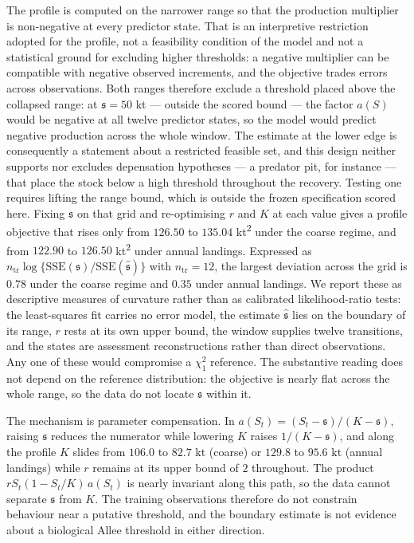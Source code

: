 \documentclass[11pt]{article}
\begin{document}
The profile is computed on the narrower range so that the production
multiplier is non-negative at every predictor state. That is an
interpretive restriction adopted for the profile, not a feasibility
condition of the model and not a statistical ground for excluding higher
thresholds: a negative multiplier can be compatible with negative
observed increments, and the objective trades errors across
observations. Both ranges therefore exclude
a threshold placed above the collapsed range: at \(\mathfrak s = 50\) kt
--- outside the scored bound --- the factor \(a(S)\) would be negative
at all twelve predictor states, so the model would predict negative
production across the whole window. The estimate at the lower edge is
consequently a statement about a restricted feasible set, and this
design neither supports nor excludes depensation hypotheses --- a
predator pit, for instance --- that place the stock below a high
threshold throughout the recovery. Testing one requires lifting the
range bound, which is outside the frozen specification scored here. Fixing
\(\mathfrak s\) on that grid and re-optimising \(r\) and \(K\) at each
value gives a profile objective that rises only from \(126.50\) to
\(135.04\) kt\textsuperscript{2} under the coarse regime, and from
\(122.90\) to \(126.50\) kt\textsuperscript{2} under annual landings. Expressed as
\(n_{\mathrm{tr}}\log\{\mathrm{SSE}(\mathfrak s)/
\mathrm{SSE}(\hat{\mathfrak s})\}\) with \(n_{\mathrm{tr}}=12\), the
largest deviation across the grid is \(0.78\) under the coarse regime
and \(0.35\) under annual landings. We report these as descriptive
measures of curvature rather than as calibrated likelihood-ratio tests:
the least-squares fit carries no error model, the estimate
\(\hat{\mathfrak s}\) lies on the boundary of its range, \(r\) rests
at its own upper bound, the window supplies twelve transitions, and the
states are assessment reconstructions rather than direct observations.
Any one of these would compromise a \(\chi^2_1\) reference. The
substantive reading does not depend on the reference distribution: the
objective is nearly flat across the whole range, so the data do not
locate \(\mathfrak s\) within it.

The mechanism is parameter compensation. In
\(a(S_t)=(S_t-\mathfrak s)/(K-\mathfrak s)\), raising \(\mathfrak s\)
reduces the numerator while lowering \(K\) raises \(1/(K-\mathfrak s)\),
and along the profile \(K\) slides from \(106.0\) to \(82.7\) kt
(coarse) or \(129.8\) to \(95.6\) kt (annual landings) while \(r\)
remains at its upper bound of \(2\) throughout. The product
\(rS_t(1-S_t/K)\,a(S_t)\) is nearly invariant along this path, so the
data cannot separate \(\mathfrak s\) from \(K\). The training
observations therefore do not constrain behaviour near a putative
threshold, and the boundary estimate is not evidence about a biological
Allee threshold in either direction.
\end{document}
